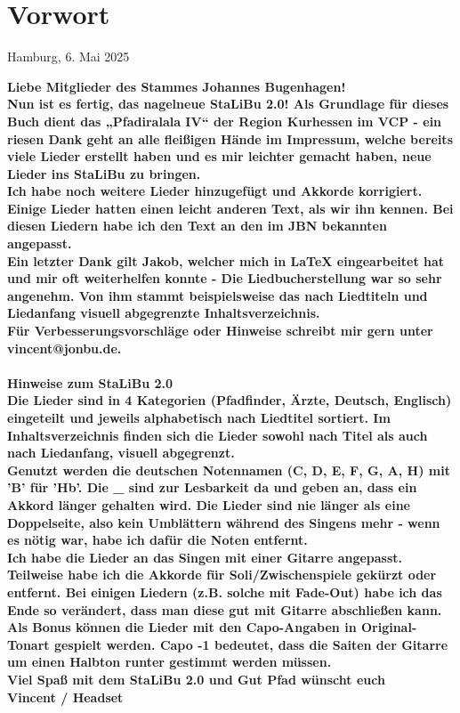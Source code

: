 \section*{Vorwort}

\begin{flushright}
    Hamburg, 6. Mai 2025
\end{flushright}


\bf Liebe Mitglieder des Stammes Johannes Bugenhagen! \sf \\

Nun ist es fertig, das nagelneue StaLiBu 2.0! Als Grundlage für dieses Buch dient das „Pfadiralala IV“ der Region Kurhessen im VCP - ein riesen Dank geht an alle fleißigen Hände im Impressum, welche bereits viele Lieder erstellt haben und es mir leichter gemacht haben, neue Lieder ins StaLiBu zu bringen. \\

Ich habe noch weitere Lieder hinzugefügt und Akkorde korrigiert. Einige Lieder hatten einen leicht anderen Text, als wir ihn kennen. Bei diesen Liedern habe ich den Text an den im JBN bekannten angepasst. \\

Ein letzter Dank gilt Jakob, welcher mich in LaTeX eingearbeitet hat und mir oft weiterhelfen konnte - Die Liedbucherstellung war so sehr angenehm. Von ihm stammt beispielsweise das nach Liedtiteln und Liedanfang visuell abgegrenzte Inhaltsverzeichnis. \\

Für Verbesserungsvorschläge oder Hinweise schreibt mir gern unter vincent@jonbu.de. \\ \\

\bf Hinweise zum StaLiBu 2.0 \sf \\

Die Lieder sind in 4 Kategorien (Pfadfinder, Ärzte, Deutsch, Englisch) eingeteilt und jeweils alphabetisch nach Liedtitel sortiert. Im Inhaltsverzeichnis finden sich die Lieder sowohl nach Titel als auch nach Liedanfang, visuell abgegrenzt. \\

Genutzt werden die deutschen Notennamen (C, D, E, F, G, A, H) mit 'B' für 'Hb'. \newline
Die \_ sind zur Lesbarkeit da und geben an, dass ein Akkord länger gehalten wird. Die Lieder sind nie länger als eine Doppelseite, also kein Umblättern während des Singens mehr - wenn es nötig war, habe ich dafür die Noten entfernt. \\

Ich habe die Lieder an das Singen mit einer Gitarre angepasst. Teilweise habe ich die Akkorde für Soli/Zwischenspiele gekürzt oder entfernt. Bei einigen Liedern (z.B. solche mit Fade-Out) habe ich das Ende so verändert, dass man diese gut mit Gitarre abschließen kann.
Als Bonus können die Lieder mit den Capo-Angaben in Original-Tonart gespielt werden. Capo -1 bedeutet, dass die Saiten der Gitarre um einen Halbton runter gestimmt werden müssen. \\

Viel Spaß mit dem StaLiBu 2.0 und Gut Pfad wünscht euch\\
Vincent / Headset